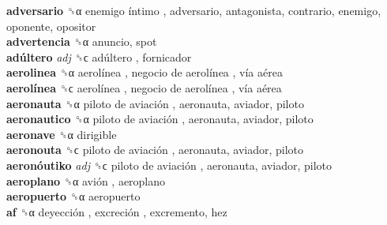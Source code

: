 \textbf{adversario} ␝α   enemigo íntimo , adversario, antagonista, contrario, enemigo, oponente, opositor  \\
\textbf{advertencia} ␝α  anuncio, spot  \\
\textbf{adúltero} \emph{adj}  ␝ϲ   adúltero , fornicador  \\
\textbf{aerolinea} ␝α   aerolínea ,  negocio de aerolínea ,  vía aérea   \\
\textbf{aerolínea} ␝ϲ   aerolínea ,  negocio de aerolínea ,  vía aérea   \\
\textbf{aeronauta} ␝α   piloto de aviación , aeronauta, aviador, piloto  \\
\textbf{aeronautico} ␝α   piloto de aviación , aeronauta, aviador, piloto  \\
\textbf{aeronave} ␝α  dirigible  \\
\textbf{aeronouta} ␝ϲ   piloto de aviación , aeronauta, aviador, piloto  \\
\textbf{aeronóutiko} \emph{adj}  ␝ϲ   piloto de aviación , aeronauta, aviador, piloto  \\
\textbf{aeroplano} ␝α   avión , aeroplano  \\
\textbf{aeropuerto} ␝α  aeropuerto  \\
\textbf{af} ␝α   deyección ,  excreción , excremento, hez  \\
